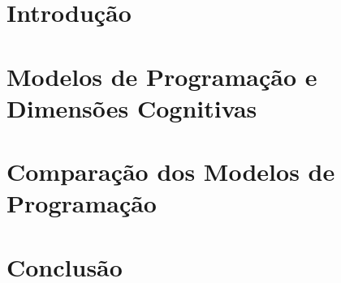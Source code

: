 \documentclass[relatorio]{unemat-comp}
\begin{document}
\chapter{Introdução}\label{chap:intro}


\chapter{Modelos de Programação e Dimensões Cognitivas}\label{chap:prog}


\chapter{Comparação dos Modelos de Programação}\label{chap:cases}


\chapter{Conclusão}\label{chap:conclusion}




\cleardoublepage


\printbibliography[heading=bibintoc,title=REFERÊNCIAS]


\apendices{}




\end{document}
